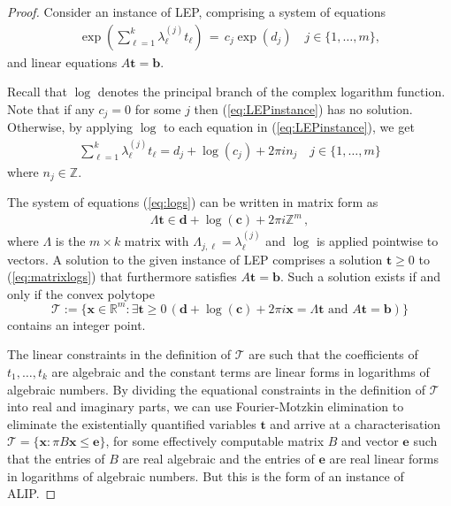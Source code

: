 \documentclass[format=acmsmall, review=false, screen=true]{acmart}
\newcommand{\Reals}{\mathbb{R}}
\newcommand{\Integers}{\mathbb{Z}}
\newcommand{\myvector}{\boldsymbol}
\begin{document}
\begin{proof}
Consider an instance of LEP, comprising a system of equations
\begin{gather}
\textstyle \exp\left(\sum_{\ell=1}^{k} \lambda_\ell^{(j)} t_{\ell} \right) \, = \, c_j \exp (d_j)
\quad j \in \{1,\ldots,m\}, 
\label{eq:LEPinstance}
\end{gather}
and linear equations $A \myvector{t} = \myvector{b}$.

Recall that $\log$ denotes the principal branch of the complex logarithm function.
Note that if any
$c_j=0$ for some $j$ then (\ref{eq:LEPinstance}) has no
solution. Otherwise, by applying $\log$ to each equation in
(\ref{eq:LEPinstance}), we get
\begin{align}
\sum_{\ell=1}^{k} \lambda_\ell^{(j)} t_{\ell} = d_j+\log(c_j) + 2\pi i n_j \quad j\in \{1,\ldots,m\}
\label{eq:logs}
\end{align}
where $n_j \in \Integers$.

The system of equations (\ref{eq:logs}) can be written in matrix form as
\begin{align}
\Lambda \myvector{t} \in \myvector{d}+\log(\myvector{c}) +
2\pi i \Integers^m \, ,
\label{eq:matrixlogs}
\end{align}
where $\Lambda$ is the $m\times k$ matrix with $\Lambda_{j,\ell} = \lambda_\ell^{(j)}$ and $\log$
is applied pointwise to vectors.  A solution to the given instance of LEP comprises
a solution $\myvector{t} \geq 0$ to (\ref{eq:matrixlogs}) that furthermore satisfies 
$A\myvector{t}=\myvector{b}$.  Such a solution exists if and only if the
convex polytope 
\[  \mathcal{T}:=
\lbrace \myvector{x}\in \Reals^m : \exists \myvector{t}\geq
0\, (\myvector{d}+\log(\myvector{c}) + 2\pi i \myvector{x} = \Lambda
\myvector{t} \mbox{ and } A\myvector{t}=\myvector{b}) \rbrace \]
contains an integer point.  

The linear constraints in the definition of $\mathcal{T}$ are such that 
the coefficients of $t_1,\ldots,t_k$ are algebraic and 
the constant terms are linear forms in logarithms of algebraic numbers.
By dividing the equational constraints in the definition of
$\mathcal{T}$ into real and imaginary parts, we can use
Fourier-Motzkin elimination to eliminate the existentially quantified
variables $\myvector{t}$ and arrive at a characterisation
$\mathcal{T}=\{ \myvector{x}: \pi B\myvector{x} \leq \myvector{e}\}$,
for some effectively computable matrix $B$ and vector $\myvector{e}$
such that the entries of $B$ are real algebraic and the entries of
$\myvector{e}$ are real linear forms in logarithms of algebraic
numbers.  But this is the form of an instance of ALIP.
\end{proof}
\end{document}
